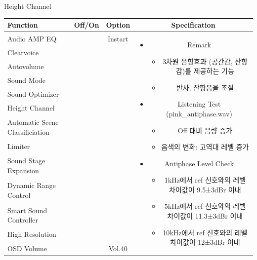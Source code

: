 \documentclass{beamer}
\begin{document}
\begin{frame}[t]{Height Channel}
\begin{tiny}
\begin{tabular}{@{}lccc@{}}
\toprule
Function & Off/On & Option & Specification \\
\midrule
Audio AMP EQ & \color{black}{Off} & Instart &
\multirow{13}{60mm}{
\begin{itemize}
\item Remark
	\begin{itemize}
	\item 3차원 음향효과 (공간감, 잔향감)를 제공하는 기능
	\item 반사, 잔향음을 조절
	\end{itemize}
\item Listening Test (pink\_antiphase.wav)
	\begin{itemize}
	\item Off 대비 음량 증가
	\item 음색의 변화: 고역대 레벨 증가
	\end{itemize}
\item Antiphase Level Check
  \begin{itemize}
  \item 1kHz에서 ref 신호와의 레벨 차이값이 9.5±3dBr 이내
  \item 5kHz에서 ref 신호와의 레벨 차이값이 11.3±3dBr 이내
  \item 10kHz에서 ref 신호와의 레벨 차이값이 12±3dBr 이내
  \end{itemize}
\end{itemize}
} \\
Clearvoice & \color{black}{Off} & & \\
Autovolume & \color{black}{Off} & & \\
Sound Mode & \color{black}{Off} & & \\
Sound Optimizer & \color{black}{Off} & & \\
Height Channel & \color{blue}{On} & & \\
Automatic Scene Classificiation & \color{black}{Off} & & \\
Limiter & \color{black}{Off} & & \\
Sound Stage Expansion & \color{black}{Off} & & \\
Dynamic Range Control & \color{black}{Off} & & \\
Smart Sound Controller & \color{black}{Off} & & \\
High Resolution & \color{black}{Off} & & \\
OSD Volume & \color{blue}{On} & Vol.40 & \\
\midrule
\end{tabular}
\end{tiny}

\end{frame}
\end{document}
